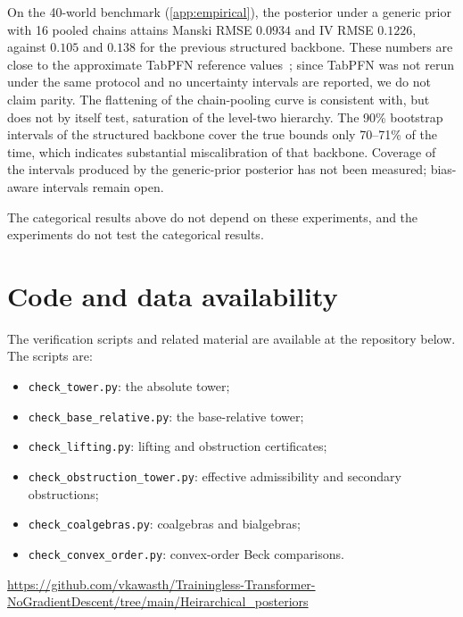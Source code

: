 \documentclass[11pt]{article}
\theoremstyle{definition}
\theoremstyle{remark}
\begin{document}
On the 40-world benchmark (\cref{app:empirical}), the posterior under a generic prior with 16 pooled
chains attains Manski RMSE $0.0934$ and IV RMSE $0.1226$, against $0.105$ and $0.138$ for the
previous structured backbone. These numbers are close to the approximate TabPFN reference
values~\cite{Hollmann2023}; since TabPFN was not rerun under the same protocol and no uncertainty
intervals are reported, we do not claim parity. The flattening of the chain-pooling curve is
consistent with, but does not by itself test, saturation of the level-two hierarchy. The 90\%
bootstrap intervals of the structured backbone cover the true bounds only 70--71\% of the time, which
indicates substantial miscalibration of that backbone. Coverage of the intervals produced by the
generic-prior posterior has not been measured; bias-aware intervals remain open.

The categorical results above do not depend on these experiments, and the experiments do not test
the categorical results.

\section{Code and data availability}

The verification scripts and related material are available at the repository below. The scripts
are:
\begin{itemize}[leftmargin=*,nosep]
\item \texttt{check\_tower.py}: the absolute tower;
\item \texttt{check\_base\_relative.py}: the base-relative tower;
\item \texttt{check\_lifting.py}: lifting and obstruction certificates;
\item \texttt{check\_obstruction\_tower.py}: effective admissibility and secondary obstructions;
\item \texttt{check\_coalgebras.py}: coalgebras and bialgebras;
\item \texttt{check\_convex\_order.py}: convex-order Beck comparisons.
\end{itemize}
\begin{center}\small\url{https://github.com/vkawasth/Trainingless-Transformer-NoGradientDescent/tree/main/Heirarchical_posteriors}\end{center}

\end{document}
